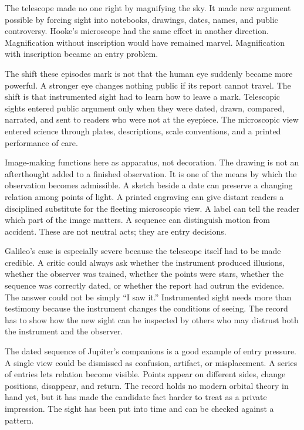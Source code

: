 The telescope made no one right by magnifying the sky. It made new
argument possible by forcing sight into notebooks, drawings, dates, names,
and public controversy. Hooke's microscope had the same effect in another
direction. Magnification without inscription would have remained marvel.
Magnification with inscription became an entry problem.

The shift these episodes mark is not that the human eye suddenly became
more powerful. A stronger eye changes nothing public if its report cannot
travel. The shift is that instrumented sight had to learn how to leave a
mark. Telescopic sights entered public argument only when they were dated,
drawn, compared, narrated, and sent to readers who were not at the
eyepiece. The microscopic view entered science through plates,
descriptions, scale conventions, and a printed performance of care.

Image-making functions here as apparatus, not decoration. The drawing is
not an afterthought added to a finished observation. It is one of the
means by which the observation becomes admissible. A sketch beside a date
can preserve a changing relation among points of light. A printed
engraving can give distant readers a disciplined substitute for the
fleeting microscopic view. A label can tell the reader which part of the
image matters. A sequence can distinguish motion from accident. These are
not neutral acts; they are entry decisions.

Galileo's case is especially severe because the telescope itself had to
be made credible. A critic could always ask whether the instrument
produced illusions, whether the observer was trained, whether the points
were stars, whether the sequence was correctly dated, or whether the
report had outrun the evidence. The answer could not be simply ``I saw
it.'' Instrumented sight needs more than testimony because the instrument
changes the conditions of seeing. The record has to show how the new
sight can be inspected by others who may distrust both the instrument and
the observer.

The dated sequence of Jupiter's companions is a good example of entry
pressure. A single view could be dismissed as confusion, artifact, or
misplacement. A series of entries lets relation become visible. Points
appear on different sides, change positions, disappear, and return. The
record holds no modern orbital theory in hand yet, but it has made the
candidate fact harder to treat as a private impression. The sight has
been put into time and can be checked against a pattern.

